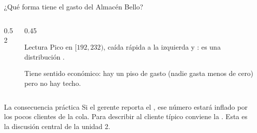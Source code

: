 \documentclass[aspectratio=169,10pt]{beamer}
\begin{document}
\begin{frame}{¿Qué forma tiene el gasto del Almacén Bello?}
  \footnotesize
  \begin{columns}[T,onlytextwidth]
    \begin{column}{0.52\textwidth}
      \centering
    \end{column}
    \begin{column}{0.45\textwidth}
      \begin{exampleblock}{Lectura}
        \scriptsize
        Pico en $[192,232)$, caída rápida a la izquierda y : es una distribución .

        \vspace{0.15cm}
        Tiene sentido económico: hay un piso de gasto (nadie gasta menos de
        cero) pero no hay techo.
      \end{exampleblock}
    \end{column}
  \end{columns}

  \vspace{0.1cm}
  \begin{alertblock}{La consecuencia práctica}
    \scriptsize
    Si el gerente reporta el , ese número estará
    inflado por los pocos clientes de la cola. Para describir al cliente
    típico conviene la . Esta es la discusión central de la
    unidad 2.
  \end{alertblock}
\end{frame}
\end{document}
